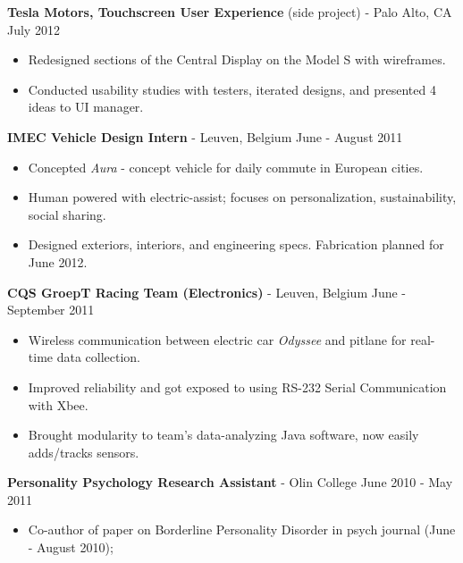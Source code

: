 \documentclass[margin]{res}
\begin{document}
{\bf Tesla Motors, Touchscreen User Experience} (side project) - Palo Alto, CA \hfill            July 2012\
\smallskip
	\begin{itemize}  \itemsep -4pt %
	
	 \item Redesigned sections of the Central Display on the Model S with wireframes.  
\item Conducted usability studies with testers, iterated designs, and presented 4 ideas to UI manager. 
	\end{itemize}
 

	{ \bf IMEC Vehicle Design Intern} - Leuven, Belgium \hfill            June - August 2011\
\smallskip
	\begin{itemize}  \itemsep -4pt %
	
	 \item Concepted {\emph{Aura}} - concept vehicle for daily commute in European cities. 
	\item  Human powered with electric-assist; focuses on personalization, sustainability, social sharing.  
\item Designed exteriors, interiors, and engineering specs.  Fabrication planned for June 2012.
	\end{itemize}



	{\bf CQS GroepT Racing Team (Electronics) } - Leuven, Belgium \hfill            June - September 2011 \
	\smallskip
	\begin{itemize}  \itemsep -4pt %
			
                 \item Wireless communication between electric car {\textit{Odyssee}} and pitlane for real-time data collection.  
	\item Improved reliability and got exposed to using RS-232 Serial Communication with Xbee.
	\item Brought modularity to team's data-analyzing Java software, now easily adds/tracks sensors.
	\end{itemize}
	


         {\bf Personality Psychology Research Assistant} - Olin College \hfill            June 2010 - May 2011 \
	\smallskip
                 \begin{itemize}  \itemsep -4pt %
			
                 \item Co-author of paper on Borderline Personality Disorder in psych journal  {\small{(June - August 2010)}}; 
                 \end{itemize}
\end{document}
